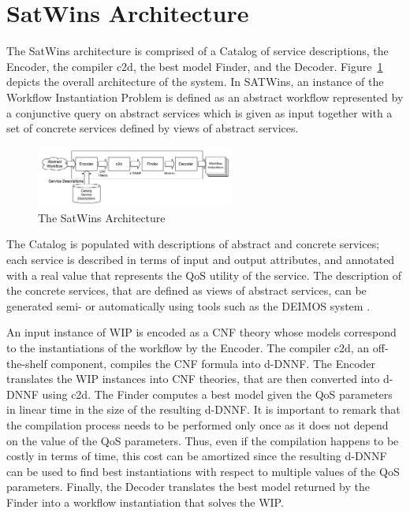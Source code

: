 \documentclass{llncs}
\begin{document}
\section{SatWins Architecture}
 The SatWins architecture  is comprised of a Catalog of service descriptions,
the Encoder, the compiler c2d, the best model Finder, and the Decoder.
Figure~\ref{fig:architecture} depicts the overall architecture of the system.
In SATWins, an instance of the Workflow Instantiation Problem is defined as an
abstract workflow represented by a conjunctive query on abstract services which
is given as input together with a set of concrete services defined by views
of abstract services. 

\begin{figure}[t]
\centering
\includegraphics[height=20mm,width=.6\textwidth]{architecture}
\caption{The SatWins Architecture}
\label{fig:architecture}
\end{figure}

The Catalog is populated with descriptions of abstract and concrete services;
each service is described in terms of input and output attributes, and annotated
with a real value that represents the QoS utility of the service.
The description of the concrete services, that are defined as views of abstract
services, can be generated semi- or automatically using tools such as the DEIMOS
system \cite{AmbiteISWC09}. 

An input instance of WIP is encoded as a CNF theory whose models correspond to
the instantiations of the workflow by the Encoder. 
The compiler c2d, an off-the-shelf
component, compiles the CNF formula into d-DNNF.
The Encoder translates the WIP instances into CNF theories, that are then converted
into d-DNNF using c2d. The Finder computes a best model given the QoS parameters
in linear time in the size of the resulting d-DNNF. It is important to remark
that the compilation process needs to be performed only once as it does not
depend on the value of the QoS parameters. Thus, even if the compilation happens
to be costly in terms of time, this cost can be amortized since the resulting
d-DNNF can be used to find best instantiations with respect to multiple values
of the QoS parameters.
Finally, the Decoder translates the best model returned by the Finder into
a workflow instantiation that solves the WIP.
\end{document}
